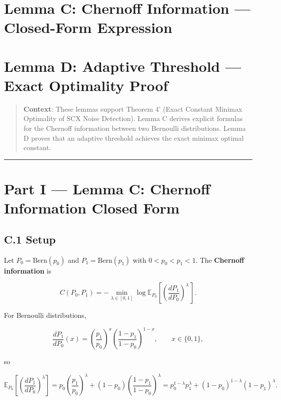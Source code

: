 \documentclass[
  12pt,
]{article}
\author{SCX}
\date{2026}
\begin{document}
\section{Lemma C: Chernoff Information --- Closed-Form
Expression}\label{lemma-c-chernoff-information-closed-form-expression}

\section{Lemma D: Adaptive Threshold --- Exact Optimality
Proof}\label{lemma-d-adaptive-threshold-exact-optimality-proof}

\begin{quote}
\textbf{Context}: These lemmas support Theorem 4' (Exact Constant
Minimax Optimality of SCX Noise Detection). Lemma C derives explicit
formulas for the Chernoff information between two Bernoulli
distributions. Lemma D proves that an adaptive threshold achieves the
exact minimax optimal constant.
\end{quote}

\begin{center}\rule{0.5\linewidth}{0.5pt}\end{center}

\section{Part I --- Lemma C: Chernoff Information Closed
Form}\label{part-i-lemma-c-chernoff-information-closed-form}

\subsection{C.1 Setup}\label{c.1-setup}

Let \(P_0 = \text{Bern}(p_0)\) and \(P_1 = \text{Bern}(p_1)\) with
\(0 < p_0 < p_1 < 1\). The \textbf{Chernoff information} is

\[
C(P_0, P_1) = -\min_{\lambda \in [0,1]} \log \mathbb{E}_{P_0}\!\left[\left(\frac{dP_1}{dP_0}\right)^{\!\!\lambda}\,\right].
\]

For Bernoulli distributions,

\[
\frac{dP_1}{dP_0}(x) = \left(\frac{p_1}{p_0}\right)^x \left(\frac{1-p_1}{1-p_0}\right)^{1-x}, \qquad x \in \{0,1\},
\]

so

\[
\mathbb{E}_{P_0}\!\left[\left(\frac{dP_1}{dP_0}\right)^{\!\!\lambda}\right]
= p_0 \left(\frac{p_1}{p_0}\right)^\lambda + (1-p_0) \left(\frac{1-p_1}{1-p_0}\right)^\lambda
= p_0^{1-\lambda} p_1^\lambda + (1-p_0)^{1-\lambda} (1-p_1)^\lambda.
\]
\end{document}
